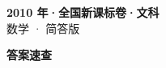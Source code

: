 \documentclass[zihao=-4, a4paper]{ctexart}
\begin{document}
\begin{center}
  {\Large\bfseries 2010 年·全国新课标卷·文科}\\[4pt]
  {\large 数学 · 简答版}
\end{center}
\medskip
{}

\clearpage
{}
\begin{center}{\Large\bfseries 答案速查}\end{center}
\medskip

\end{document}

